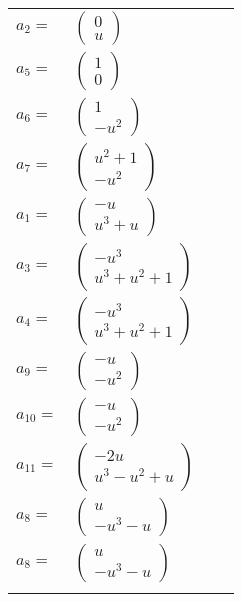 \documentclass[1p]{elsarticle_modified}
\theoremstyle{definition}
\begin{document}
\begin{tabular}{m{7pt} m{180pt} m{7pt} m{180pt} }
\flushright $a_{2}=$&$\begin{pmatrix}0\\u\end{pmatrix}$ \\
\flushright $a_{5}=$&$\begin{pmatrix}1\\0\end{pmatrix}$ \\
\flushright $a_{6}=$&$\begin{pmatrix}1\\- u^2\end{pmatrix}$ \\
\flushright $a_{7}=$&$\begin{pmatrix}u^2+1\\- u^2\end{pmatrix}$ \\
\flushright $a_{1}=$&$\begin{pmatrix}- u\\u^3+u\end{pmatrix}$ \\
\flushright $a_{3}=$&$\begin{pmatrix}- u^3\\u^3+u^2+1\end{pmatrix}$ \\
\flushright $a_{4}=$&$\begin{pmatrix}- u^3\\u^3+u^2+1\end{pmatrix}$ \\
\flushright $a_{9}=$&$\begin{pmatrix}- u\\- u^2\end{pmatrix}$ \\
\flushright $a_{10}=$&$\begin{pmatrix}- u\\- u^2\end{pmatrix}$ \\
\flushright $a_{11}=$&$\begin{pmatrix}-2 u\\u^3- u^2+u\end{pmatrix}$ \\
\flushright $a_{8}=$&$\begin{pmatrix}u\\- u^3- u\end{pmatrix}$\\ \flushright $a_{8}=$&$\begin{pmatrix}u\\- u^3- u\end{pmatrix}$\\&\end{tabular}
\end{document}
